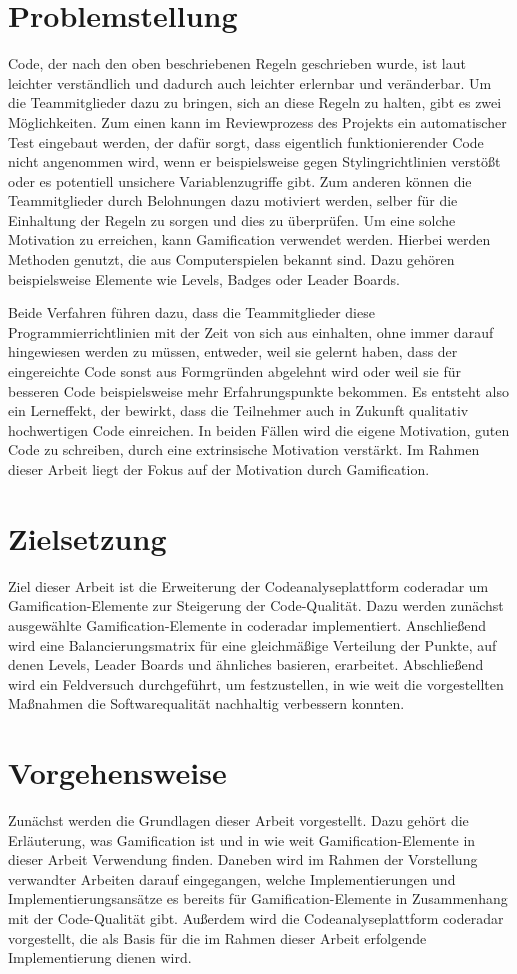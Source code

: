 \documentclass[fontsize=11pt, paper=a4, parskip=half]{scrartcl}
\begin{document}
\section{Problemstellung}
Code, der nach den oben beschriebenen Regeln geschrieben wurde, ist laut \cite{PJ2015} leichter verständlich und dadurch auch leichter erlernbar und veränderbar.
Um die Teammitglieder dazu zu bringen, sich an diese Regeln zu halten, gibt es zwei Möglichkeiten.
Zum einen kann im Reviewprozess des Projekts ein automatischer Test eingebaut werden, der dafür sorgt, dass eigentlich funktionierender Code nicht angenommen wird, wenn er beispielsweise gegen Stylingrichtlinien verstößt oder es potentiell unsichere Variablenzugriffe gibt.
Zum anderen können die Teammitglieder durch Belohnungen dazu motiviert werden, selber für die Einhaltung der Regeln zu sorgen und dies zu überprüfen.
Um eine solche Motivation zu erreichen, kann Gamification verwendet werden.
Hierbei werden Methoden genutzt, die aus Computerspielen bekannt sind.
Dazu gehören beispielsweise Elemente wie Levels, Badges oder Leader Boards. 

Beide Verfahren führen dazu, dass die Teammitglieder diese Programmierrichtlinien mit der Zeit von sich aus einhalten, ohne immer darauf hingewiesen werden zu müssen, entweder, weil sie gelernt haben, dass der eingereichte Code sonst aus Formgründen abgelehnt wird oder weil sie für besseren Code beispielsweise mehr Erfahrungspunkte bekommen.
Es entsteht also ein Lerneffekt, der bewirkt, dass die Teilnehmer auch in Zukunft qualitativ hochwertigen Code einreichen.
In beiden Fällen wird die eigene Motivation, guten Code zu schreiben, durch eine extrinsische Motivation verstärkt.
Im Rahmen dieser Arbeit liegt der Fokus auf der Motivation durch Gamification.


\section{Zielsetzung}
Ziel dieser Arbeit ist die Erweiterung der Codeanalyseplattform coderadar um Gamification-Elemente zur Steigerung der Code-Qualität.
Dazu werden zunächst ausgewählte Gamification-Elemente in coderadar implementiert.
Anschließend wird eine Balancierungsmatrix für eine gleichmäßige Verteilung der Punkte, auf denen Levels, Leader Boards und ähnliches basieren, erarbeitet.
Abschließend wird ein Feldversuch durchgeführt, um festzustellen, in wie weit die vorgestellten Maßnahmen die Softwarequalität nachhaltig verbessern konnten.

\section{Vorgehensweise}
Zunächst werden die Grundlagen dieser Arbeit vorgestellt.
Dazu gehört die Erläuterung, was Gamification ist und in wie weit Gamification-Elemente in dieser Arbeit Verwendung finden.
Daneben wird im Rahmen der Vorstellung verwandter Arbeiten darauf eingegangen, welche Implementierungen und Implementierungsansätze es bereits für Gamification-Elemente in Zusammenhang mit der Code-Qualität gibt.
Außerdem wird die Codeanalyseplattform coderadar vorgestellt, die als Basis für die im Rahmen dieser Arbeit erfolgende Implementierung dienen wird.
\end{document}
